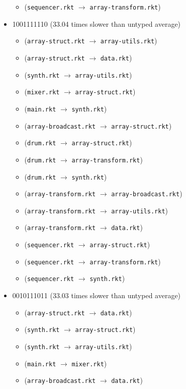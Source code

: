 \documentclass{article}
\newcommand{\mono}[1]{\texttt{#1}}
\begin{document}
\begin{itemize}
\begin{itemize}
  \item (\mono{sequencer.rkt} $\rightarrow$ \mono{array-transform.rkt})
  \end{itemize}
\item 1001111110 (33.04 times slower than untyped average)
  \begin{itemize}
  \item (\mono{array-struct.rkt} $\rightarrow$ \mono{array-utils.rkt})
  \item (\mono{array-struct.rkt} $\rightarrow$ \mono{data.rkt})
  \item (\mono{synth.rkt} $\rightarrow$ \mono{array-utils.rkt})
  \item (\mono{mixer.rkt} $\rightarrow$ \mono{array-struct.rkt})
  \item (\mono{main.rkt} $\rightarrow$ \mono{synth.rkt})
  \item (\mono{array-broadcast.rkt} $\rightarrow$ \mono{array-struct.rkt})
  \item (\mono{drum.rkt} $\rightarrow$ \mono{array-struct.rkt})
  \item (\mono{drum.rkt} $\rightarrow$ \mono{array-transform.rkt})
  \item (\mono{drum.rkt} $\rightarrow$ \mono{synth.rkt})
  \item (\mono{array-transform.rkt} $\rightarrow$ \mono{array-broadcast.rkt})
  \item (\mono{array-transform.rkt} $\rightarrow$ \mono{array-utils.rkt})
  \item (\mono{array-transform.rkt} $\rightarrow$ \mono{data.rkt})
  \item (\mono{sequencer.rkt} $\rightarrow$ \mono{array-struct.rkt})
  \item (\mono{sequencer.rkt} $\rightarrow$ \mono{array-transform.rkt})
  \item (\mono{sequencer.rkt} $\rightarrow$ \mono{synth.rkt})
  \end{itemize}
\item 0010111011 (33.03 times slower than untyped average)
  \begin{itemize}
  \item (\mono{array-struct.rkt} $\rightarrow$ \mono{data.rkt})
  \item (\mono{synth.rkt} $\rightarrow$ \mono{array-struct.rkt})
  \item (\mono{synth.rkt} $\rightarrow$ \mono{array-utils.rkt})
  \item (\mono{main.rkt} $\rightarrow$ \mono{mixer.rkt})
  \item (\mono{array-broadcast.rkt} $\rightarrow$ \mono{data.rkt})

\end{itemize}
\end{itemize}
\end{document}
